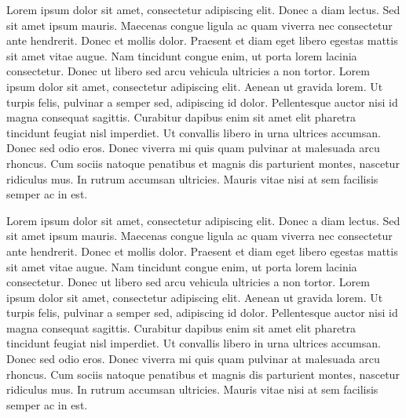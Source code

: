 Lorem ipsum dolor sit amet, consectetur adipiscing elit. Donec a diam lectus.
Sed sit amet ipsum mauris. Maecenas congue ligula ac quam viverra nec
consectetur ante hendrerit. Donec et mollis dolor. Praesent et diam eget libero
egestas mattis sit amet vitae augue. Nam tincidunt congue enim, ut porta lorem
lacinia consectetur. Donec ut libero sed arcu vehicula ultricies a non tortor.
Lorem ipsum dolor sit amet, consectetur adipiscing elit. Aenean ut gravida
lorem. Ut turpis felis, pulvinar a semper sed, adipiscing id dolor. Pellentesque
auctor nisi id magna consequat sagittis. Curabitur dapibus enim sit amet elit
pharetra tincidunt feugiat nisl imperdiet. Ut convallis libero in urna ultrices
accumsan. Donec sed odio eros. Donec viverra mi quis quam pulvinar at malesuada
arcu rhoncus. Cum sociis natoque penatibus et magnis dis parturient montes,
nascetur ridiculus mus. In rutrum accumsan ultricies. Mauris vitae nisi at sem
facilisis semper ac in est.

Lorem ipsum dolor sit amet, consectetur adipiscing elit. Donec a diam lectus.
Sed sit amet ipsum mauris. Maecenas congue ligula ac quam viverra nec
consectetur ante hendrerit. Donec et mollis dolor. Praesent et diam eget libero
egestas mattis sit amet vitae augue. Nam tincidunt congue enim, ut porta lorem
lacinia consectetur. Donec ut libero sed arcu vehicula ultricies a non tortor.
Lorem ipsum dolor sit amet, consectetur adipiscing elit. Aenean ut gravida
lorem. Ut turpis felis, pulvinar a semper sed, adipiscing id dolor. Pellentesque
auctor nisi id magna consequat sagittis. Curabitur dapibus enim sit amet elit
pharetra tincidunt feugiat nisl imperdiet. Ut convallis libero in urna ultrices
accumsan. Donec sed odio eros. Donec viverra mi quis quam pulvinar at malesuada
arcu rhoncus. Cum sociis natoque penatibus et magnis dis parturient montes,
nascetur ridiculus mus. In rutrum accumsan ultricies. Mauris vitae nisi at sem
facilisis semper ac in est.
